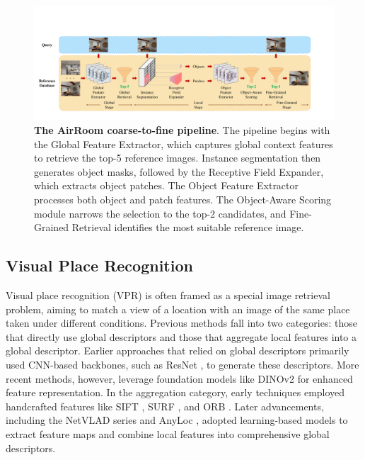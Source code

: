 \begin{figure}[ht]
    \centering
    \includegraphics[width=\textwidth]{pipeline_font.pdf}
    \vspace{-16pt}
    \caption{\textbf{The AirRoom coarse-to-fine pipeline}. The pipeline begins with the Global Feature Extractor, which captures global context features to retrieve the top-5 reference images. Instance segmentation then generates object masks, followed by the Receptive Field Expander, which extracts object patches. The Object Feature Extractor processes both object and patch features. The Object-Aware Scoring module narrows the selection to the top-2 candidates, and Fine-Grained Retrieval identifies the most suitable reference image.}
    \vspace{-15pt}
    \label{fig:pipeline}
\end{figure}

\subsection{Visual Place Recognition}

Visual place recognition (VPR) is often framed as a special image retrieval problem, aiming to match a view of a location with an image of the same place taken under different conditions.
Previous methods fall into two categories: those that directly use global descriptors and those that aggregate local features into a global descriptor. Earlier approaches that relied on global descriptors primarily used CNN-based backbones, such as ResNet \cite{he2015deepresiduallearningimage}, to generate these descriptors. More recent methods, however, leverage foundation models like DINOv2 \cite{oquab2024dinov2learningrobustvisual} for enhanced feature representation. In the aggregation category, early techniques employed handcrafted features like SIFT \cite{Lowe2004DistinctiveIF}, SURF \cite{10.1007/11744023_32}, and ORB \cite{6126544}. Later advancements, including the NetVLAD series \cite{arandjelović2016netvladcnnarchitectureweakly, hausler2021patchnetvladmultiscalefusionlocallyglobal} and AnyLoc \cite{keetha2023anylocuniversalvisualplace}, adopted learning-based models to extract feature maps and combine local features into comprehensive global descriptors.

